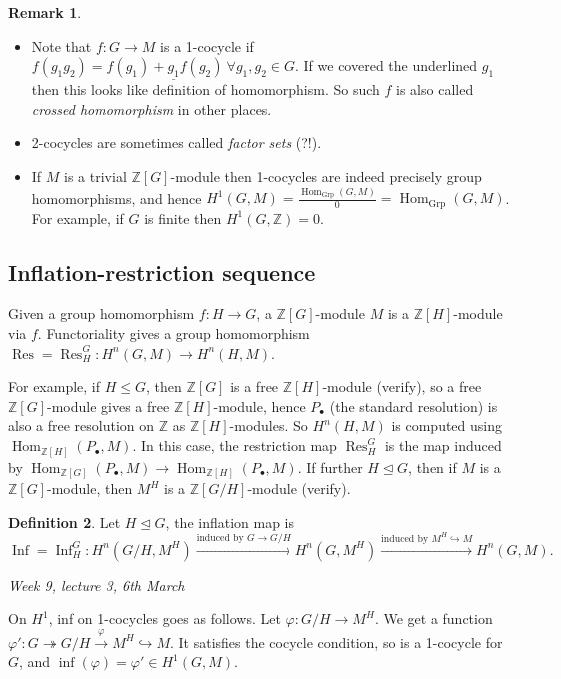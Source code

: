 \documentclass{article}
\newcommand{\Z}{\mathbb{Z}}
\newcommand{\Hom}{\operatorname{Hom}}
\newcommand{\Grp}{{\operatorname{Grp}}}
\newcommand{\Res}{\operatorname{Res}}
\newcommand{\Inf}{\operatorname{Inf}}
\theoremstyle{definition}
\newtheorem{defn}{Definition}[subsection]
\newtheorem{remark}[defn]{Remark}
\begin{document}
\begin{remark}
\begin{itemize}
\item Note that $f:G\rightarrow M$ is a 1-cocycle if $f(g_1g_2)=f(g_1)+\underline{g_1}f(g_2) \ \forall g_1,g_2\in G$. If we covered the underlined $g_1$ then this looks like definition of homomorphism. So such $f$ is also called \textit{crossed homomorphism} in other places.
\item 2-cocycles are sometimes called \textit{factor sets} (?!).
\item If $M$ is a trivial $\Z[G]$-module then 1-cocycles are indeed precisely group homomorphisms, and hence $H^1(G,M)=\frac{\Hom_\Grp(G,M)}{0}=\Hom_\Grp(G,M)$. For example, if $G$ is finite then $H^1(G,\Z)=0$.
\end{itemize}
\end{remark}

\subsection{Inflation-restriction sequence}
Given a group homomorphism $f:H\rightarrow G$, a $\Z[G]$-module $M$ is a $\Z[H]$-module via $f$. Functoriality gives a group homomorphism $\Res=\Res^G_H:H^n(G,M)\rightarrow H^n(H,M)$.

For example, if $H\leq G$, then $\Z[G]$ is a free $\Z[H]$-module (verify), so a free $\Z[G]$-module gives a free $\Z[H]$-module, hence $P_\bullet$ (the standard resolution) is also a free resolution on $\Z$ as $\Z[H]$-modules. So $H^n(H,M)$ is computed using $\Hom_{\Z[H]}(P_\bullet,M)$. In this case, the restriction map $\Res^G_H$ is the map induced by $\Hom_{\Z[G]}(P_\bullet,M)\rightarrow\Hom_{\Z[H]}(P_\bullet,M)$. If further $H\unlhd G$, then if $M$ is a $\Z[G]$-module, then $M^H$ is a $\Z[G/H]$-module (verify).

\begin{defn}
Let $H\unlhd G$, the inflation map is
\[
\Inf=\Inf_H^G:H^n(G/H,M^H)\xrightarrow{\text{induced by }G\rightarrow G/H} H^n(G,M^H)\xrightarrow{\text{induced by }M^H\hookrightarrow M} H^n(G,M).
\]
\end{defn}

\begin{flushright}
\textit{Week 9, lecture 3, 6th March}
\end{flushright}

On $H^1$, inf on 1-cocycles goes as follows. Let $\varphi:G/H\rightarrow M^H$. We get a function $\varphi':G\twoheadrightarrow G/H\xrightarrow{\varphi}M^H\hookrightarrow M$. It satisfies the cocycle condition, so is a 1-cocycle for $G$, and $\inf(\varphi)=\varphi'\in H^1(G,M)$.
\end{document}
